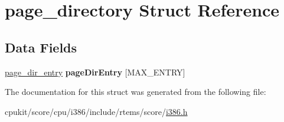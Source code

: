 \hypertarget{structpage__directory}{}\section{page\+\_\+directory Struct Reference}
\label{structpage__directory}
\subsection*{Data Fields}
\begin{DoxyCompactItemize}
\item 
\mbox{\label{structpage__directory_af47089c06ae301afb0356a85d44d1eb9}} 
\mbox{\hyperlink{unionpage__dir__entry}{page\+\_\+dir\+\_\+entry}} {\bfseries page\+Dir\+Entry} \mbox{[}M\+A\+X\+\_\+\+E\+N\+T\+RY\mbox{]}
\end{DoxyCompactItemize}


The documentation for this struct was generated from the following file\+:\begin{DoxyCompactItemize}
\item 
cpukit/score/cpu/i386/include/rtems/score/\mbox{\hyperlink{i386_8h}{i386.\+h}}\end{DoxyCompactItemize}
